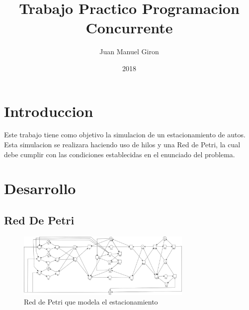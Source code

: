 \documentclass{article}
\title{Trabajo Practico Programacion Concurrente}
\author{Juan Manuel Giron}
\date{2018}
\begin{document}
\maketitle

\section{Introduccion}
Este trabajo tiene como objetivo la simulacion de un estacionamiento de autos. 
Esta simulacion se realizara haciendo uso de hilos y una Red de Petri, la cual 
debe cumplir con las condiciones establecidas en el enunciado del problema.
\section{Desarrollo}
	\subsection{Red De Petri}
	\begin{figure}[h]
		\centering
		\includegraphics[width=0.75\textwidth]{RedDePetri}
		\caption{Red de Petri que modela el estacionamiento}
		\label{fig:mesh1}
	\end{figure}
\end{document}
